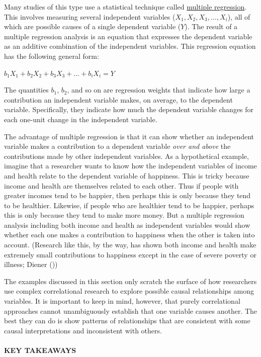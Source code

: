 \documentclass[
]{krantz}
\begin{document}
Many studies of this type use a statistical technique called \hyperref[multiple-regression]{multiple regression}. This involves measuring several independent variables (\(X_1, X_2, X_3,…, X_i\)), all of which are possible causes of a single dependent variable (\(Y\)). The result of a multiple regression analysis is an equation that expresses the dependent variable as an additive combination of the independent variables. This regression equation has the following general form:

\(b_1X_1 + b_2X_2 + b_3X_3+ … + b_iX_i= Y\)

The quantities \(b_1\), \(b_2\), and so on are regression weights that indicate how large a contribution an independent variable makes, on average, to the dependent variable. Specifically, they indicate how much the dependent variable changes for each one-unit change in the independent variable.

The advantage of multiple regression is that it can show whether an independent variable makes a contribution to a dependent variable \emph{over and above} the contributions made by other independent variables. As a hypothetical example, imagine that a researcher wants to know how the independent variables of income and health relate to the dependent variable of happiness. This is tricky because income and health are themselves related to each other. Thus if people with greater incomes tend to be happier, then perhaps this is only because they tend to be healthier. Likewise, if people who are healthier tend to be happier, perhaps this is only because they tend to make more money. But a multiple regression analysis including both income and health as independent variables would show whether each one makes a contribution to happiness when the other is taken into account. (Research like this, by the way, has shown both income and health make extremely small contributions to happiness except in the case of severe poverty or illness; Diener ())

The examples discussed in this section only scratch the surface of how researchers use complex correlational research to explore possible causal relationships among variables. It is important to keep in mind, however, that purely correlational approaches cannot unambiguously establish that one variable causes another. The best they can do is show patterns of relationships that are consistent with some causal interpretations and inconsistent with others.

\paragraph*{KEY TAKEAWAYS}\label{key-takeaways-20}
\end{document}
